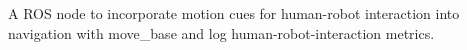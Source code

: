 A R\+OS node to incorporate motion cues for human-\/robot interaction into navigation with move\+\_\+base and log human-\/robot-\/interaction metrics. 